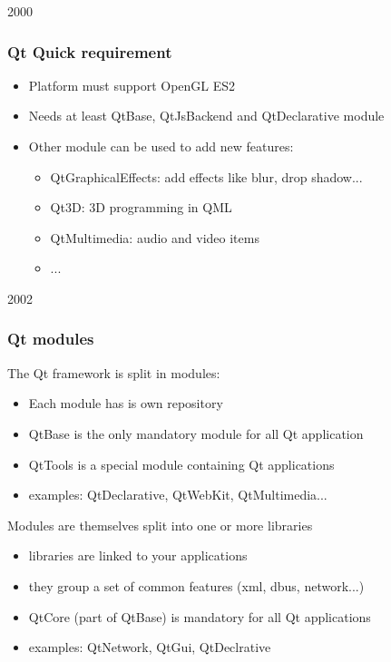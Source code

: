 
\begin{slide}{2000}\frametitle{Qt Quick requirement}
\vspace*{1.5em}
\begin{itemize}
\item Platform must support OpenGL ES2
\item Needs at least QtBase, QtJsBackend and QtDeclarative module
\item Other module can be used to add new features:
\begin{itemize}
\item QtGraphicalEffects: add effects like blur, drop shadow...
\item Qt3D: 3D programming in QML
\item QtMultimedia: audio and video items
\item ...
\end{itemize}
\end{itemize}

\end{slide}

\begin{slide}{2002}\frametitle{Qt modules}
\vspace*{1.5em}
The Qt framework is split in modules:
\begin{itemize}
\item Each module has is own repository
\item QtBase is the only mandatory module for all Qt application
\item QtTools is a special module containing Qt applications
\item examples: QtDeclarative, QtWebKit, QtMultimedia...
\end{itemize}\medskip
Modules are themselves split into one or more libraries
\begin{itemize}
\item libraries are linked to your applications
\item they group a set of common features (xml, dbus, network...)
\item QtCore (part of QtBase) is mandatory for all Qt applications
\item examples: QtNetwork, QtGui, QtDeclrative
\end{itemize}

\end{slide}

